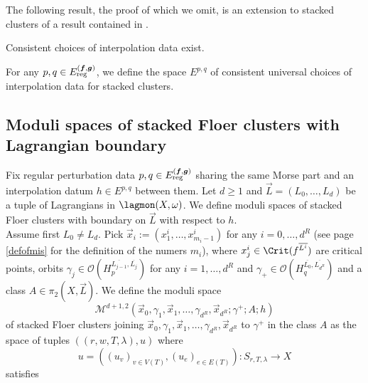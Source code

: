 	The following result, the proof of which we omit, is an extension to stacked clusters of a result contained in \cite{Sylvan2019OnCategories}.
	\begin{lemma}
		Consistent choices of interpolation data exist.
	\end{lemma}
	\noindent For any $p,q\in E^{(\boldsymbol{f},\boldsymbol{g})}_\textnormal{reg}$, we define the space $E^{p,q}$ of consistent universal choices of interpolation data for stacked clusters.
	
	\subsection{Moduli spaces of stacked Floer clusters with Lagrangian boundary}
	Fix regular perturbation data $p,q\in E^{(\boldsymbol{f},\boldsymbol{g})}_\textnormal{reg}$ sharing the same Morse part and an interpolation datum $h\in E^{p,q}$ between them. Let $d\geq 1$ and $\vec{L}=(L_0,\ldots, L_d)$ be a tuple of Lagrangians in $\lagmon(X,\omega)$. We define moduli spaces of stacked Floer clusters with boundary on $\vec{L}$ with respect to $h$.\\
	Assume first $L_0\neq L_d$. Pick $\vec{x}_i:=(x^i_1,\ldots,x^i_{m_i-1})$ for any $i=0,\ldots,d^R$ (see page \ref{defofmis} for the definition of the numers $m_i$), where $x^i_j\in \Crit(f^{\overline{L^i}})$ are critical points, orbits $\gamma_j\in \mathcal{O}(H^{\overline{L_{j-1}},\overline{L_j}}_p)$ for any $i=1,\ldots,d^R$ and $\gamma_+\in \mathcal{O}(H^{\overline{L_0},\overline{L_{d^R}}}_q)$ and a class $A\in \pi_2(X,\vec{L})$. We define the moduli space $$\mathcal{M}^{d+1,2}\left(\vec{x}_0, \gamma_1, \vec{x}_1,\ldots,\gamma_{d^R}, \vec{x}_{d^R}; \gamma^+;A;h\right)$$ of stacked Floer clusters joining $\vec{x}_0, \gamma_1, \vec{x}_1,\ldots,\gamma_{d^R}, \vec{x}_{d^R}$ to $\gamma^+$ in the class $A$ as the space of tuples $((r,w,T,\lambda),u)$ where $$u=\left((u_v)_{v\in V(T)}, (u_e)_{e\in E(T)}\right)\colon S_{r,T,\lambda}\to X$$ satisfies
	
